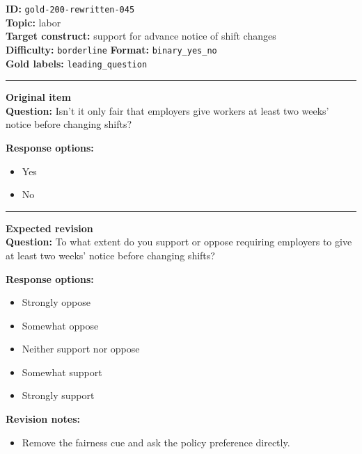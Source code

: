 \documentclass[10pt,a4paper]{article}
\newcommand{\sectionline}{\vspace{0.15em}\hrule\vspace{0.35em}}
\begin{document}
\begin{tcolorbox}[colframe=FlawRed,colback=white,colbacktitle=FlawRed!9,coltitle=black,title={Item 045\hfill Flawed item}]
\textbf{ID:} \texttt{gold-200-rewritten-045}\\
\textbf{Topic:} labor\\
\textbf{Target construct:} support for advance notice of shift changes\\
\textbf{Difficulty:} \texttt{borderline} \quad \textbf{Format:} \texttt{binary\_yes\_no}\\
\textbf{Gold labels:} \texttt{leading\_question}\\
\sectionline
\textbf{Original item}\\
\textbf{Question:} Isn't it only fair that employers give workers at least two weeks' notice before changing shifts?
\par\textbf{Response options:}
\begin{itemize}
\item Yes
\item No
\end{itemize}
\sectionline
\textbf{Expected revision}\\
\textbf{Question:} To what extent do you support or oppose requiring employers to give at least two weeks' notice before changing shifts?
\par\textbf{Response options:}
\begin{itemize}
\item Strongly oppose
\item Somewhat oppose
\item Neither support nor oppose
\item Somewhat support
\item Strongly support
\end{itemize}
\par\textbf{Revision notes:}
\begin{itemize}
\item Remove the fairness cue and ask the policy preference directly.
\end{itemize}
\end{tcolorbox}
\end{document}
